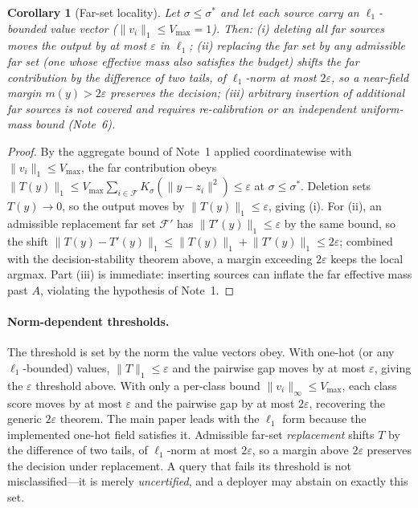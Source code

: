 \documentclass[10pt,twocolumn]{article}
\newtheorem{corollary}{Corollary}
\newcommand{\Ksig}{K_{\sigma}}
\newcommand{\sstar}{\sigma^{*}}
\begin{document}
\begin{corollary}[Far-set locality]
Let $\sigma\le\sstar$ and let each source carry an $\ell_1$-bounded value vector ($\lVert v_i\rVert_1\le V_{\max}=1$). Then: (i) deleting all far sources moves the output by at most $\varepsilon$ in $\ell_1$; (ii) replacing the far set by any admissible far set (one whose effective mass also satisfies the budget) shifts the far contribution by the difference of two tails, of $\ell_1$-norm at most $2\varepsilon$, so a near-field margin $m(y)>2\varepsilon$ preserves the decision; (iii) arbitrary insertion of additional far sources is not covered and requires re-calibration or an independent uniform-mass bound (Note~6).
\end{corollary}
\begin{proof}
By the aggregate bound of Note~1 applied coordinatewise with $\lVert v_i\rVert_1\le V_{\max}$, the far contribution obeys $\lVert T(y)\rVert_1\le V_{\max}\sum_{i\in\mathcal{F}}\Ksig(\lVert y-z_i\rVert^2)\le\varepsilon$ at $\sigma\le\sstar$. Deletion sets $T(y)\to 0$, so the output moves by $\lVert T(y)\rVert_1\le\varepsilon$, giving (i). For (ii), an admissible replacement far set $\mathcal{F}'$ has $\lVert T'(y)\rVert_1\le\varepsilon$ by the same bound, so the shift $\lVert T(y)-T'(y)\rVert_1\le\lVert T(y)\rVert_1+\lVert T'(y)\rVert_1\le 2\varepsilon$; combined with the decision-stability theorem above, a margin exceeding $2\varepsilon$ keeps the local argmax. Part (iii) is immediate: inserting sources can inflate the far effective mass past $A$, violating the hypothesis of Note~1.
\end{proof}

\paragraph{Norm-dependent thresholds.} The threshold is set by the norm the value vectors obey. With one-hot (or any $\ell_1$-bounded) values, $\lVert T\rVert_1\le\varepsilon$ and the pairwise gap moves by at most $\varepsilon$, giving the $\varepsilon$ threshold above. With only a per-class bound $\lVert v_i\rVert_\infty\le V_{\max}$, each class score moves by at most $\varepsilon$ and the pairwise gap by at most $2\varepsilon$, recovering the generic $2\varepsilon$ theorem. The main paper leads with the $\ell_1$ form because the implemented one-hot field satisfies it. Admissible far-set \emph{replacement} shifts $T$ by the difference of two tails, of $\ell_1$-norm at most $2\varepsilon$, so a margin above $2\varepsilon$ preserves the decision under replacement. A query that fails its threshold is not misclassified---it is merely \emph{uncertified}, and a deployer may abstain on exactly this set.
\end{document}
